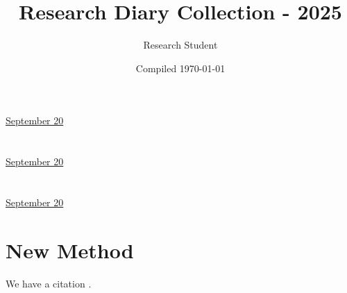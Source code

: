\documentclass[letterpaper,11pt]{article}
\title{Research Diary Collection - 2025}
\author{Research Student}
\date{Compiled \today}
\begin{document}
\tableofcontents
\thispagestyle{empty}
\newpage


\href{run:2025-09-20-3.tex}{\Huge September 20} %

\section*{ }



\clearpage


\href{run:2025-09-20-corrected-test.tex}{\Huge September 20} %

\section*{ }



\clearpage


\href{run:2025-09-20-newmethod.tex}{\Huge September 20} %

\section{New Method}

We have a citation \cite{research_methods2024}.


\clearpage




\end{document}
